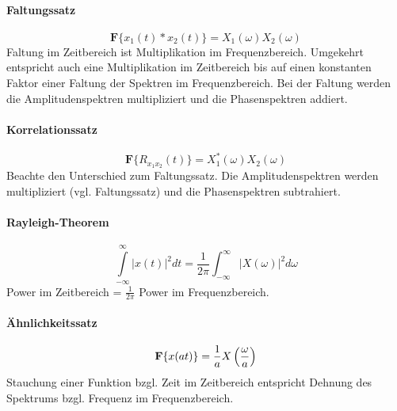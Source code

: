 \paragraph{Faltungssatz} 
\begin{equation}
\textbf{F} \{x_1(t) * x_2(t)\}= X_1(\omega) X_2(\omega)
\end{equation}
Faltung im Zeitbereich ist Multiplikation im Frequenzbereich. Umgekehrt entspricht auch eine Multiplikation im Zeitbereich bis auf einen konstanten Faktor einer Faltung der Spektren im Frequenzbereich. Bei der Faltung werden die Amplitudenspektren multipliziert und die Phasenspektren addiert.

\paragraph{Korrelationssatz}
\begin{equation}
\textbf{F} \{R_{x_1x_2}(t)\}= X_1^\ast(\omega) X_2(\omega)
\end{equation}
Beachte den Unterschied zum Faltungssatz. Die Amplitudenspektren werden multipliziert (vgl. Faltungssatz) und die Phasenspektren subtrahiert.

\paragraph{Rayleigh-Theorem}
\begin{equation}
\int\limits_{-\infty}^{\infty} | x(t) |^2 dt = \frac{1}{2\pi} \int_{-\infty}^{\infty} | X(\omega)|^2 d\omega
\end{equation}
Power im Zeitbereich = $\frac{1}{2\pi}$ Power im Frequenzbereich.

\paragraph{Ähnlichkeitssatz}
\begin{equation}
{\bf F} \{x(at)\}= \frac{1}{a} X\left(\frac{\omega}{a}\right)
\end{equation}
Stauchung einer Funktion bzgl. Zeit im Zeitbereich entspricht Dehnung des Spektrums bzgl. Frequenz im Frequenzbereich.


